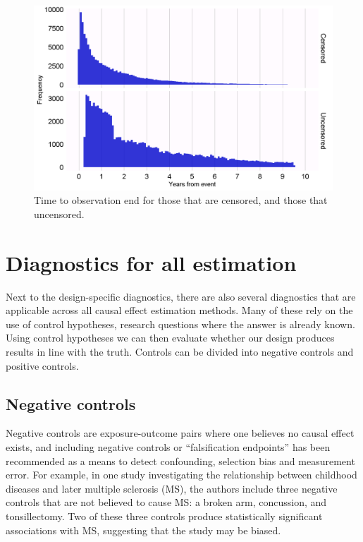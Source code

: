 \documentclass[11pt]{book}
\theoremstyle{definition}
\theoremstyle{definition}
\theoremstyle{definition}
\theoremstyle{remark}
\begin{document}
\begin{figure}

{\centering \includegraphics[width=1\linewidth]{images/MethodValidity/timeToObsEnd} 

}

\caption{Time to observation end for those that are censored, and those that uncensored.}\label{fig:timeToObsEnd}
\end{figure}

\hypertarget{diagnostics-for-all-estimation}{%
\section{Diagnostics for all estimation}\label{diagnostics-for-all-estimation}}

Next to the design-specific diagnostics, there are also several diagnostics that are applicable across all causal effect estimation methods. Many of these rely on the use of control hypotheses, research questions where the answer is already known. Using control hypotheses we can then evaluate whether our design produces results in line with the truth. Controls can be divided into negative controls and positive controls.

\hypertarget{NegativeControls}{%
\subsection{Negative controls}\label{NegativeControls}}

Negative controls are exposure-outcome pairs where one believes no causal effect exists, and including negative controls or ``falsification endpoints'' \citep{prased_2013} has been recommended as a means to detect confounding, \citep{lipsitch_2010} selection bias and measurement error. \citep{arnold_2016} For example, in one study \citep{zaadstra_2008} investigating the relationship between childhood diseases and later multiple sclerosis (MS), the authors include three negative controls that are not believed to cause MS: a broken arm, concussion, and tonsillectomy. Two of these three controls produce statistically significant associations with MS, suggesting that the study may be biased.
\end{document}
